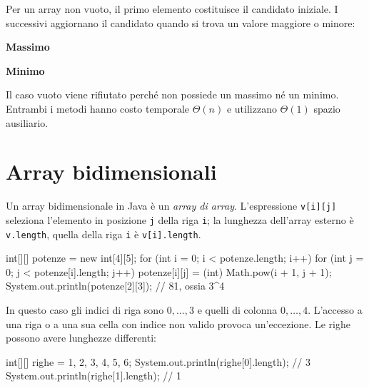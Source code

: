 Per un array non vuoto, il primo elemento costituisce il
candidato iniziale. I successivi aggiornano il candidato
quando si trova un valore maggiore o minore:

\noindent
\begin{minipage}[t]{0.48\linewidth}
\vspace{0pt}
\textbf{Massimo}


\end{minipage}%
\hfill
\begin{minipage}[t]{0.48\linewidth}
\vspace{0pt}
\textbf{Minimo}


\end{minipage}

Il caso vuoto viene rifiutato perché non possiede un massimo
né un minimo. Entrambi i metodi hanno costo temporale \(\Theta(n)\) e
utilizzano \(\Theta(1)\) spazio ausiliario.

\section{Array bidimensionali}
\label{sec:fi-java-array-bidimensionali}

Un array bidimensionale in Java è un \emph{array di array}.
L'espressione \texttt{v[i][j]} seleziona l'elemento in posizione
\texttt{j} della riga \texttt{i}; la lunghezza dell'array
esterno è \texttt{v.length}, quella della riga \texttt{i} è
\texttt{v[i].length}.

\begin{unipdcode}[language=Java]
int[][] potenze = new int[4][5];
for (int i = 0; i < potenze.length; i++) {
    for (int j = 0; j < potenze[i].length; j++) {
        potenze[i][j] = (int) Math.pow(i + 1, j + 1);
    }
}
System.out.println(potenze[2][3]);  // 81, ossia 3^4
\end{unipdcode}

\clearpage

In questo caso gli indici di riga sono \(0,\ldots,3\) e quelli
di colonna \(0,\ldots,4\). L'accesso a una riga o
a una sua cella con indice non valido provoca un'eccezione.
Le righe possono avere lunghezze differenti:

\begin{unipdcode}[language=Java]
int[][] righe = {{1, 2, 3}, {4}, {5, 6}};
System.out.println(righe[0].length); // 3
System.out.println(righe[1].length); // 1
\end{unipdcode}

